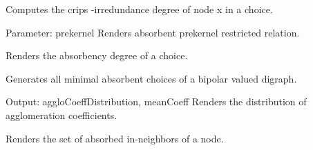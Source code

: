 \documentclass[letterpaper,10pt,english]{sphinxmanual}
\begin{document}
\begin{fulllineitems}
\begin{fulllineitems}
\label{techDoc:digraphs.Digraph.absirredx}
Computes the crips -irredundance degree of node x in a choice.

\end{fulllineitems}


\begin{fulllineitems}
\label{techDoc:digraphs.Digraph.abskernelrestrict}
Parameter: prekernel
Renders absorbent prekernel restricted relation.

\end{fulllineitems}


\begin{fulllineitems}
\label{techDoc:digraphs.Digraph.absorb}
Renders the absorbency degree of a choice.

\end{fulllineitems}


\begin{fulllineitems}
\label{techDoc:digraphs.Digraph.absorbentChoices}
Generates all minimal absorbent choices of a bipolar valued digraph.

\end{fulllineitems}


\begin{fulllineitems}
\label{techDoc:digraphs.Digraph.agglomerationDistribution}
Output: aggloCoeffDistribution, meanCoeff
Renders the distribution of agglomeration coefficients.

\end{fulllineitems}


\begin{fulllineitems}
\label{techDoc:digraphs.Digraph.aneighbors}
Renders the set of absorbed in-neighbors of a node.


\end{fulllineitems}
\end{fulllineitems}
\end{document}
